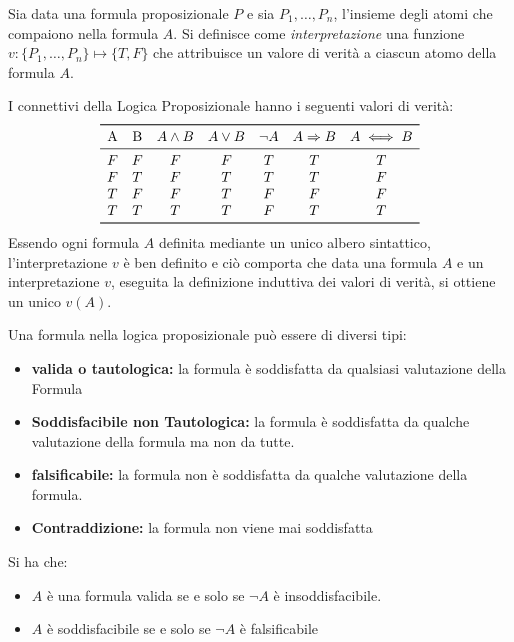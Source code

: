 \documentclass[a4paper,12pt, oneside]{book}
\begin{document}
\begin{definizione}
  Sia data una formula proposizionale $P$ e sia ${P_1,\dots,P_n}$, l'insieme
  degli 
  atomi che compaiono nella formula $A$. Si definisce come
  \emph{interpretazione} una 
  funzione $v:\{P_1,\dots,P_n\} \mapsto \{T,F\}$ che attribuisce un valore di
  verità 
  a ciascun atomo della formula $A$.
\end{definizione}

I connettivi della Logica Proposizionale hanno i seguenti valori di verità:
\[
  \begin{array}{ccccccc}
    \toprule
    \text{A} & \text{B} & A \land B & A \lor B & \neg A & A \Rightarrow B & A
                                                                            \iff
                                                                            B \\
    \midrule
    F & F & F & F & T & T & T \\
    F & T & F & T & T & T & F \\
    T & F & F & T & F & F & F \\
    T & T & T & T & F & T & T \\
    \bottomrule
  \end{array}
\]
Essendo ogni formula $A$ definita mediante un unico albero sintattico,
l'interpretazione $v$ 
è ben definito e ciò comporta che data una formula $A$ e un interpretazione
$v$, 
eseguita la definizione induttiva dei valori di verità, si ottiene un unico
$v(A)$. 

\begin{definizione}
  Una formula nella logica proposizionale può essere di diversi tipi:
  \begin{itemize}
    \item \textbf{valida o tautologica:} la formula è soddisfatta da qualsiasi
    valutazione della Formula 
    \item \textbf{Soddisfacibile non Tautologica:} la formula è soddisfatta da
    qualche valutazione 
    della formula ma non da tutte.
    \item \textbf{falsificabile:} la formula non è soddisfatta da qualche
    valutazione della formula. 
    \item \textbf{Contraddizione:} la formula non viene mai soddisfatta
  \end{itemize}
\end{definizione}

\begin{teorema}
  Si ha che:
  \begin{itemize}
    \item $A$ è una formula valida se e solo se $\neg A$ è insoddisfacibile.
    \item $A$ è soddisfacibile se e solo se $\neg A$ è falsificabile
  \end{itemize}
\end{teorema}
\end{document}
